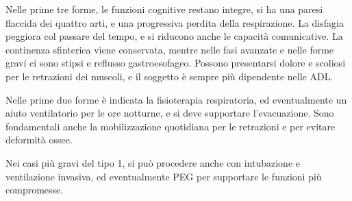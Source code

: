 Nelle prime tre forme, le funzioni cognitive restano integre, si ha una paresi flaccida dei quattro arti, e una progressiva perdita
della respirazione. La disfagia peggiora col passare del tempo, e si riducono anche le capacità comunicative. La continenza sfinterica
viene conservata, mentre nelle fasi avanzate e nelle forme gravi ci sono stipsi e reflusso gastroesofageo. Possono presentarsi dolore e
scoliosi per le retrazioni dei muscoli, e il soggetto è sempre più dipendente nelle ADL.

Nelle prime due forme è indicata la fisioterapia respiratoria, ed eventualmente un aiuto ventilatorio per le ore notturne, e si deve
supportare l'evacuazione. Sono fondamentali anche la mobilizzazione quotidiana per le retrazioni e per evitare deformità ossee. 

Nei casi più gravi del tipo 1, si può procedere anche con intubazione e ventilazione invasiva, ed eventualmente PEG per supportare le
funzioni più compromesse. 
